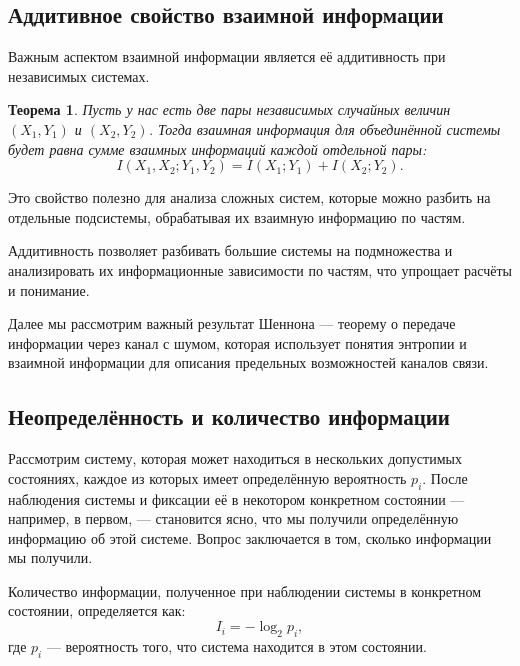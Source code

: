 \documentclass[12pt,a4paper]{article}
\newtheorem{theorem}{Теорема}[section]
\newenvironment{thmbox}[1][]{%
  \begin{tcolorbox}[enhanced, breakable, colback=thmcolor, colframe=blue!50!black, title=#1, fonttitle=\bfseries, arc=3pt, boxrule=0.5pt]
}{\end{tcolorbox}}
\newenvironment{defbox}[1][]{%
  \begin{tcolorbox}[enhanced, breakable, colback=defcolor, colframe=green!50!black, title=#1, fonttitle=\bfseries, arc=3pt, boxrule=0.5pt]
}{\end{tcolorbox}}
\newenvironment{rembox}[1][]{%
  \begin{tcolorbox}[enhanced, breakable, colback=gray!5, colframe=gray!50, title=#1, fonttitle=\bfseries, arc=3pt, boxrule=0.5pt]
}{\end{tcolorbox}}
\begin{document}
\subsection{Аддитивное свойство взаимной информации}

Важным аспектом взаимной информации является её аддитивность при независимых системах.

\begin{thmbox}[Аддитивность взаимной информации]
\begin{theorem}
Пусть у нас есть две пары независимых случайных величин $(X_1, Y_1)$ и $(X_2, Y_2)$. Тогда взаимная информация для объединённой системы будет равна сумме взаимных информаций каждой отдельной пары:
\[
I(X_1, X_2; Y_1, Y_2) = I(X_1; Y_1) + I(X_2; Y_2).
\]
\end{theorem}
\end{thmbox}

Это свойство полезно для анализа сложных систем, которые можно разбить на отдельные подсистемы, обрабатывая их взаимную информацию по частям.

\begin{rembox}[Практическое применение аддитивности]
Аддитивность позволяет разбивать большие системы на подмножества и анализировать их информационные зависимости по частям, что упрощает расчёты и понимание.
\end{rembox}

Далее мы рассмотрим важный результат Шеннона — теорему о передаче информации через канал с шумом, которая использует понятия энтропии и взаимной информации для описания предельных возможностей каналов связи.
\subsection{Неопределённость и количество информации}

Рассмотрим систему, которая может находиться в нескольких допустимых состояниях, каждое из которых имеет определённую вероятность $p_i$. После наблюдения системы и фиксации её в некотором конкретном состоянии — например, в первом, — становится ясно, что мы получили определённую информацию об этой системе. Вопрос заключается в том, сколько информации мы получили.

\begin{defbox}[Количество информации в наблюдаемом событии]
Количество информации, полученное при наблюдении системы в конкретном состоянии, определяется как:
\[
I_i = -\log_2 p_i,
\]
где $p_i$ — вероятность того, что система находится в этом состоянии.
\end{defbox}
\end{document}
